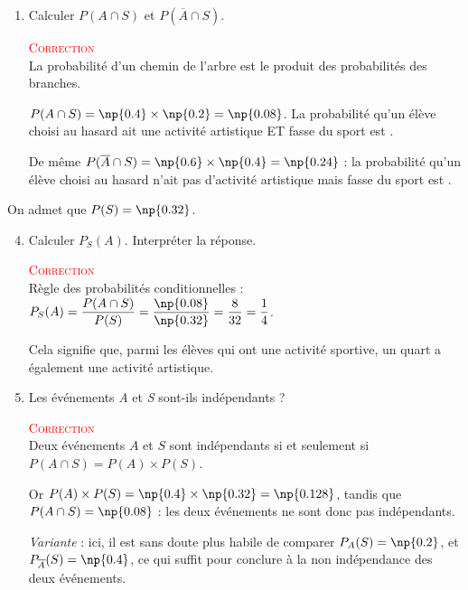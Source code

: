 \begin{enumerate}
		\item Calculer \mbox{$P(A\cap S)$} et \mbox{$P(\overline{A}\cap S)$}.



		\textcolor{red}{\textsc{Correction}}\\
		La probabilité d'un chemin de l'arbre est le produit des probabilités des branches.

		 \mbox{$P(A\cap S)=\np{0.4}\times\np{0.2}=$}. La probabilité qu'un élève choisi au hasard ait une activité artistique ET fasse du sport est \np{0.08}.

		De même \mbox{$P(\overline{A}\cap S)=\np{0.6}\times\np{0.4}=$} : la probabilité qu'un élève choisi au hasard n'ait pas d'activité artistique mais fasse du sport est \np{0.24}.
	\end{enumerate}
	On admet que \mbox{$P(S)=\np{0.32}$}.
\begin{enumerate}\setcounter{enumi}{3}
	\item 	Calculer \mbox{$P_S(A)$}. Interpréter la réponse.


	\textcolor{red}{\textsc{Correction}}\\
	Règle des probabilités conditionnelles : \mbox{$P_S (A)=\dfrac{P(A\cap S)}{P(S)}=\dfrac{\np{0.08}}{\np{0.32}}=\dfrac{8}{32}=\dfrac14$}.

	Cela signifie que, parmi les élèves qui ont une activité sportive, un quart a également une activité artistique.
	\item 		Les événements \textit{A} et \textit{S} sont-ils indépendants ?


\textcolor{red}{\textsc{Correction}}\\
Deux événements $A$ et $S$ sont indépendants si et seulement si \mbox{$P(A\cap S)=P(A)\times P(S)$}.

Or \mbox{$P(A)\times P(S)=\np{0.4}\times\np{0.32}=\np{0.128}$}, tandis que \mbox{$P(A\cap S)=\np{0.08}$} : les deux événements ne sont donc pas indépendants.

\textit{Variante} : ici, il est sans doute plus habile de comparer \mbox{$P_A(S)=\np{0.2}$}, et \mbox{$P_{\overline{A}}  (S)=\np{0.4}$}, ce qui suffit pour conclure à la non indépendance des deux événements.
\end{enumerate}
